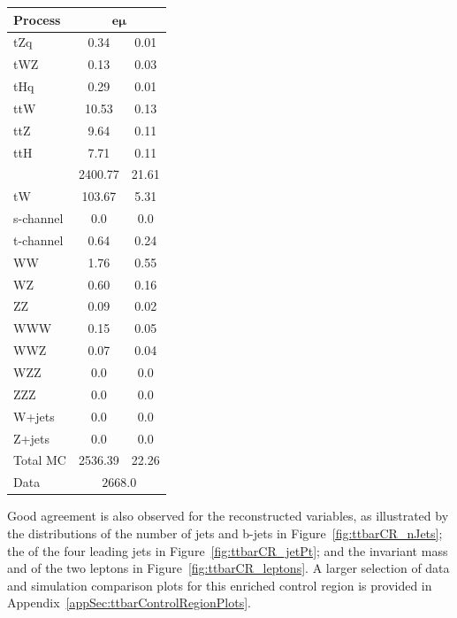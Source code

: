 \begin{table}[h]
\label{tab:ttbarCR}
  \centering
 \begin{tabular}{l S[table-format=5.3] @{${}\pm{}$} S[table-format=3.2]}
   \hline
   \textbf{Process} &   \\
   \hline
	tZq & 0.34 & 0.01  \\ 
	tWZ & 0.13 & 0.03 \\ 
	tHq & 0.29 & 0.01  \\ 
	ttW & 10.53 & 0.13   \\
	ttZ & 9.64 & 0.11   \\ 
	ttH & 7.71 & 0.11  \\ 
	\ttbar & 2400.77 & 21.61   \\ 
	tW & 103.67 & 5.31   \\ 
	s-channel & 0.0 & 0.0 \\  
	t-channel & 0.64 & 0.24 \\ 
	WW & 1.76 & 0.55  \\ 
	WZ & 0.60 & 0.16 \\ 
	ZZ & 0.09 & 0.02 \\ 
	WWW & 0.15 & 0.05    \\ 
	WWZ & 0.07 & 0.04     \\ 
	WZZ & 0.0 & 0.0     \\ 
	ZZZ & 0.0 & 0.0     \\ 
	W+jets & 0.0 & 0.0     \\ 
	Z+jets & 0.0 & 0.0     \\ 
	\hline
	Total MC & 2536.39 & 22.26     \\ 
	\hline
	Data &      \\ 
   \hline
 \end{tabular}
\end{table}

Good agreement is also observed for the reconstructed variables, as illustrated by the distributions of the number of jets and b-jets in Figure~\ref{fig:ttbarCR_nJets}; the \pT of the four leading jets in Figure~\ref{fig:ttbarCR_jetPt}; and the invariant mass and \pT of the two leptons in Figure~\ref{fig:ttbarCR_leptons}.
A larger selection of data and simulation comparison plots for this \ttbar enriched control region is provided in Appendix~\ref{appSec:ttbarControlRegionPlots}.

